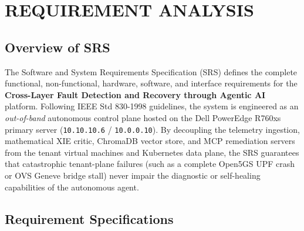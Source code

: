 \chapter{REQUIREMENT ANALYSIS}

\section{Overview of SRS}
The Software and System Requirements Specification (SRS) defines the complete functional, non-functional, hardware, software, and interface requirements for the \textbf{Cross-Layer Fault Detection and Recovery through Agentic AI} platform. Following IEEE Std 830-1998 guidelines, the system is engineered as an \textit{out-of-band} autonomous control plane hosted on the Dell PowerEdge R760xs primary server (\texttt{10.10.10.6} / \texttt{10.0.0.10}). By decoupling the telemetry ingestion, mathematical XIE critic, ChromaDB vector store, and MCP remediation servers from the tenant virtual machines and Kubernetes data plane, the SRS guarantees that catastrophic tenant-plane failures (such as a complete Open5GS UPF crash or OVS Geneve bridge stall) never impair the diagnostic or self-healing capabilities of the autonomous agent.

\section{Requirement Specifications}

